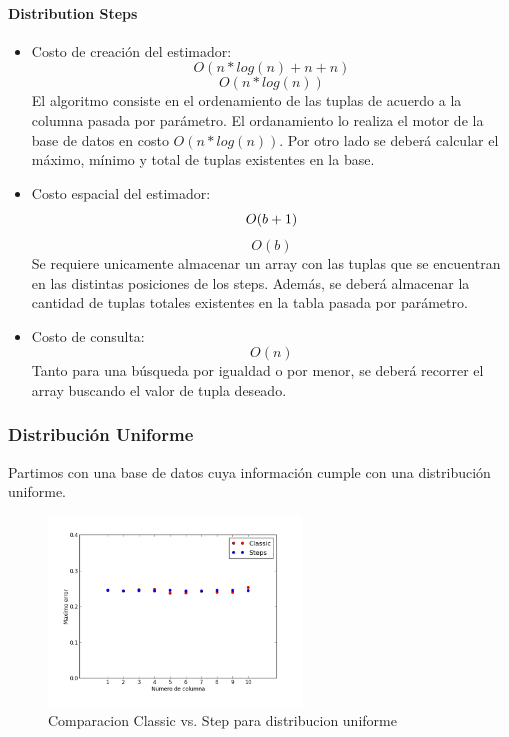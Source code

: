 \documentclass[10pt, a4paper,english,spanish,hidelinks]{article}
\begin{document}
\paragraph{Distribution Steps}

\begin{itemize}

\item Costo de creación del estimador:
\begin{equation}
O(n*log(n) + n + n)
\end{equation}
\begin{equation}
O(n*log(n))
\end{equation}
El algoritmo consiste en el ordenamiento de las tuplas de acuerdo a la columna pasada por
parámetro. El ordanamiento lo realiza el motor de la base de datos en costo $O(n*log(n))$.
Por otro lado se deberá calcular el máximo, mínimo y total de tuplas existentes en la base.

\item Costo espacial del estimador:
\begin{equation}
O(b + 1) \\
\end{equation}
\begin{equation}
O(b)
\end{equation}
Se requiere unicamente almacenar un array con las tuplas que se encuentran en las distintas
posiciones de los steps. Además, se deberá almacenar la cantidad de tuplas totales
existentes en la tabla pasada por parámetro.

\item Costo de consulta:
\begin{equation}
O(n)
\end{equation}
Tanto para una búsqueda por igualdad o por menor, se deberá recorrer el array buscando
el valor de tupla deseado.

\end{itemize}

\subsubsection{Distribución Uniforme}

Partimos con una base de datos cuya información cumple con una distribución uniforme.

\begin{figure}[h!]
  \centering
  \includegraphics[width=0.6\textwidth]{./imagenes/ejb1_uniforme.png}
  \caption{Comparacion Classic vs. Step para distribucion uniforme}
\end{figure}
\end{document}
